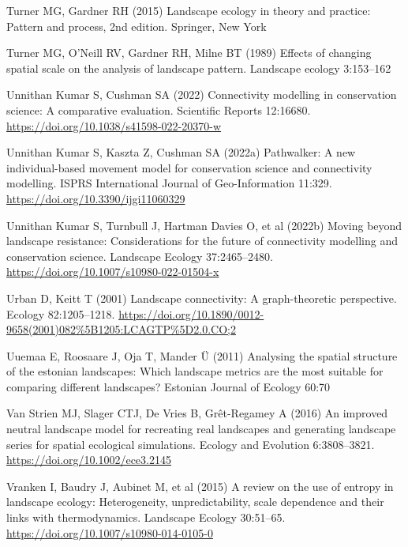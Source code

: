 \documentclass[
  10pt,
  a4paperpaper,
]{article}
\newlength{\cslhangindent}
\newenvironment{CSLReferences}[2] %
 {\begin{list}{}{%
  \setlength{\itemindent}{0pt}
  \setlength{\leftmargin}{0pt}
  \setlength{\parsep}{0pt}
  \ifodd #1
   \setlength{\leftmargin}{\cslhangindent}
   \setlength{\itemindent}{-1\cslhangindent}
  \fi
  \setlength{\itemsep}{#2\baselineskip}}}
 {\end{list}}
\begin{document}
\begin{CSLReferences}{1}{1}
Turner MG, Gardner RH (2015) Landscape ecology in theory and practice:
Pattern and process, 2nd edition. Springer, New York

Turner MG, O'Neill RV, Gardner RH, Milne BT (1989) Effects of changing
spatial scale on the analysis of landscape pattern. Landscape ecology
3:153--162

Unnithan Kumar S, Cushman SA (2022) Connectivity modelling in
conservation science: A comparative evaluation. Scientific Reports
12:16680. \url{https://doi.org/10.1038/s41598-022-20370-w}

Unnithan Kumar S, Kaszta Z, Cushman SA (2022a) Pathwalker: A new
individual-based movement model for conservation science and
connectivity modelling. ISPRS International Journal of Geo-Information
11:329. \url{https://doi.org/10.3390/ijgi11060329}

Unnithan Kumar S, Turnbull J, Hartman Davies O, et al (2022b) Moving
beyond landscape resistance: Considerations for the future of
connectivity modelling and conservation science. Landscape Ecology
37:2465--2480. \url{https://doi.org/10.1007/s10980-022-01504-x}

Urban D, Keitt T (2001) Landscape connectivity: A graph-theoretic
perspective. Ecology 82:1205--1218.
\url{https://doi.org/10.1890/0012-9658(2001)082\%5B1205:LCAGTP\%5D2.0.CO;2}

Uuemaa E, Roosaare J, Oja T, Mander Ü (2011) Analysing the spatial
structure of the estonian landscapes: Which landscape metrics are the
most suitable for comparing different landscapes? Estonian Journal of
Ecology 60:70

Van Strien MJ, Slager CTJ, De Vries B, Grêt-Regamey A (2016) An improved
neutral landscape model for recreating real landscapes and generating
landscape series for spatial ecological simulations. Ecology and
Evolution 6:3808--3821. \url{https://doi.org/10.1002/ece3.2145}

Vranken I, Baudry J, Aubinet M, et al (2015) A review on the use of
entropy in landscape ecology: Heterogeneity, unpredictability, scale
dependence and their links with thermodynamics. Landscape Ecology
30:51--65. \url{https://doi.org/10.1007/s10980-014-0105-0}


\end{CSLReferences}
\end{document}
